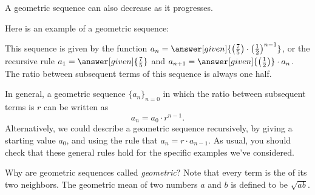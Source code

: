 \documentclass{ximera}
\begin{document}
A geometric sequence can also decrease as it progresses.

\begin{example}
  Here is an example of a geometric sequence:
  \begin{image}
  \end{image}
  This sequence is given by the function $a_n=\answer[given]{\left(\frac{7}{5}\right)\cdot
    \left(\frac{1}{2}\right)^{n-1}}$, or the recursive rule $a_1 = \answer[given]{\frac{7}{5}}$ and
  $a_{n+1} = \answer[given]{\left(\frac{1}{2}\right)}\cdot a_n$. The ratio between subsequent terms 
  of this sequence is always one half.
\end{example}

In general, a geometric sequence $\{a_n\}_{n=0}$ in which the ratio between
subsequent terms is $r$ can be written as
\[
a_n = a_0 \cdot r^{n-1}.
\]
Alternatively, we could describe a geometric sequence
recursively, by giving a starting value $a_0$, and using the rule that
$a_{n} = r \cdot a_{n-1}$.  As usual, you should check that these general 
rules hold for the specific examples we've considered.

\begin{remark}
Why are geometric sequences called \textit{geometric}?  Note that
every term is the  of its two neighbors.  The
geometric mean of two numbers $a$ and $b$ is defined to be
$\sqrt{ab}$.

\end{remark}
%
\end{document}
